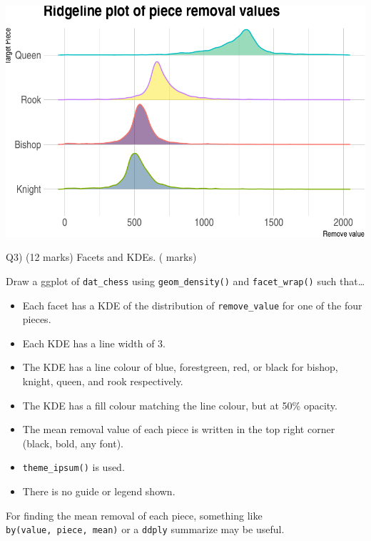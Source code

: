 \documentclass[
]{article}
\providecommand{\tightlist}{%
  \setlength{\itemsep}{0pt}\setlength{\parskip}{0pt}}
\begin{document}
\includegraphics{STAT842_Assignment2_files/figure-latex/unnamed-chunk-4-1.pdf}

\newpage

Q3) (12 marks) Facets and KDEs. ( marks)

Draw a ggplot of \texttt{dat\_chess} using \texttt{geom\_density()} and
\texttt{facet\_wrap()} such that\ldots{}

\begin{itemize}
\tightlist
\item
  Each facet has a KDE of the distribution of \texttt{remove\_value} for
  one of the four pieces.
\item
  Each KDE has a line width of 3.
\item
  The KDE has a line colour of blue, forestgreen, red, or black for
  bishop, knight, queen, and rook respectively.
\item
  The KDE has a fill colour matching the line colour, but at 50\%
  opacity.
\item
  The mean removal value of each piece is written in the top right
  corner (black, bold, any font).
\item
  \texttt{theme\_ipsum()} is used.
\item
  There is no guide or legend shown.
\end{itemize}

For finding the mean removal of each piece, something like
\texttt{by(value,\ piece,\ mean)} or a \texttt{ddply} summarize may be
useful.
\end{document}
